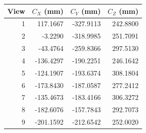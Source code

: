 \begin{tabular}{rrrr}\toprule
View & $C_X$ (mm) & $C_Y$ (mm) & $C_Z$ (mm)\\\midrule
1 & 117.1667 & -327.9113 & 242.8800 \\
2 & -3.2290 & -318.9985 & 251.7091 \\
3 & -43.4764 & -259.8366 & 297.5130 \\
4 & -136.4297 & -190.2251 & 246.1642 \\
5 & -124.1907 & -193.6374 & 308.1804 \\
6 & -173.8430 & -187.0587 & 277.2412 \\
7 & -135.4673 & -183.4166 & 306.3272 \\
8 & -182.6076 & -157.7843 & 292.7073 \\
9 & -201.1592 & -212.6542 & 252.0020 \\
\bottomrule\end{tabular}
